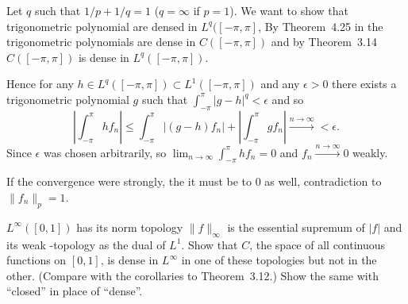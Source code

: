 \begin{enumerate}
Let $q$ such that \(1/p+1/q=1\) (\(q=\infty\) if \(p=1\)).
We want to show that trigonometric polynomial are densed in \(L^q([-\pi,\pi]\),
By Theorem~4.25 in \cite{RudinRCA87} the trigonometric polynomials
are dense in \(C([-\pi,\pi])\) and by Theorem~3.14 \cite{RudinRCA87}
\(C([-\pi,\pi])\) is dense in \(L^q([-\pi,\pi])\).

Hence for any \(h\in L^q([-\pi,\pi]) \subset L^1([-\pi,\pi])\)
and any \(\epsilon>0\) there exists a trigonometric polynomial $g$
such that \(\int_{-\pi}^\pi |g-h|^q<\epsilon\) and so
\begin{equation*}
\left|\int_{-\pi}^\pi hf_n\right|
\leq \int_{-\pi}^\pi \left|(g - h)f_n\right| 
  + \left|\int_{-\pi}^\pi  gf_n\right|
\stackrel{n\to\infty}{\longrightarrow} < \epsilon.
\end{equation*}
Since \(\epsilon\) was chosen arbitrarily, so
\(\lim_{n\to\infty}\int_{-\pi}^\pi  hf_n = 0\) and
\(f_n \stackrel{n\to\infty}{\longrightarrow} 0\) weakly.

If the convergence were strongly, the it must be to $0$ as well, 
contradiction to \(\|f_n\|_p = 1\).


\begin{excopy}
\(L^\infty([0,1])\) has its norm topology
\(\|f\|_\infty\) is the essential supremum of \(|f|\) and
its weak \upstar-topology as the dual of \(L^1\).
Show that $C$, the space of all continuous functions on \([0,1]\),
is dense in \(L^\infty\) in one of these topologies but not in the other.
(Compare with the corollaries to Theorem~3.12.)
Show the same with ``closed'' in place of ``dense''.
\end{excopy}


\end{enumerate}
